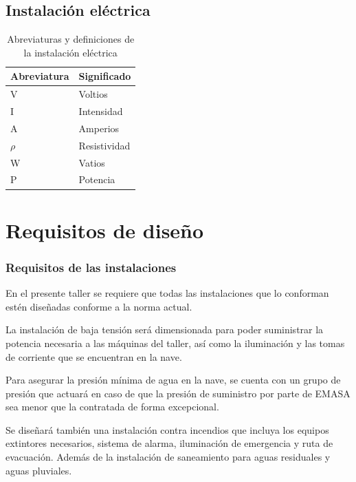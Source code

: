 \documentclass[../main.tex]{subfiles}
\begin{document}
\subsection{Instalación eléctrica}

\begin{table}[H]
    \centering
    \begin{tabular}{l | l}
         Abreviatura & Significado \\ \hline
         V & Voltios \\ \hline
         I & Intensidad \\ \hline
         A & Amperios \\ \hline
         $\rho$ & Resistividad \\ \hline
         W & Vatios \\ \hline
         P & Potencia \\ \hline
    \end{tabular}
    \caption{Abreviaturas y definiciones de la instalación eléctrica}
\end{table}


\section{Requisitos de diseño}

\subsubsection{Requisitos de las instalaciones}
En el presente taller se requiere que todas las instalaciones que lo conforman estén diseñadas conforme a la norma actual. \par
\vspace{0.5 cm}
La instalación de baja tensión será dimensionada para poder suministrar la potencia necesaria a las máquinas del taller, así como la iluminación y las tomas de corriente que se encuentran en la nave. \par
\vspace{0.5 cm}
Para asegurar la presión mínima de agua en la nave, se cuenta con un grupo de presión que actuará en caso de que la presión de suministro por parte de EMASA sea menor que la contratada de forma excepcional. \par
\vspace{0.5 cm}
Se diseñará también una instalación contra incendios que incluya los equipos extintores necesarios, sistema de alarma, iluminación de emergencia y ruta de evacuación. Además de la instalación de saneamiento para aguas residuales y aguas pluviales. \par
\end{document}
